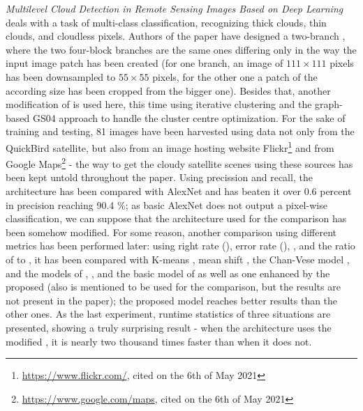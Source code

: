 \textit{Multilevel Cloud Detection in Remote Sensing Images Based on Deep Learning} deals with a task of multi-class classification, recognizing thick clouds, thin clouds, and cloudless pixels. Authors of the paper have designed a two-branch , where the two four-block branches are the same ones differing only in the way the input image patch has been created (for one branch, an image of $111 \times 111$ pixels has been downsampled to $55 \times 55$ pixels, for the other one a patch of the according size has been cropped from the bigger one). Besides that, another modification of  \cite{slic} is used here, this time using iterative clustering and the graph-based GS04 approach \cite{gs04} to handle the cluster centre optimization. For the sake of training and testing, 81  images have been harvested using data not only from the QuickBird satellite, but also from an image hosting website Flickr\footnote{\url{https://www.flickr.com/}, cited on the 6th of May 2021} and from Google Maps\footnote{\url{https://www.google.com/maps}, cited on the 6th of May 2021} - the way to get the cloudy satellite scenes using these sources has been kept untold throughout the paper. Using precission and recall, the architecture has been compared with AlexNet\cite{cnn-classification} and has beaten it over 0.6 percent in precision reaching 90.4 \%; as basic AlexNet does not output a pixel-wise classification, we can suppose that the architecture used for the comparison has been somehow modified. For some reason, another comparison using different metrics has been performed later: using right rate (), error rate (), , and the ratio of  to , it has been compared with K-means \cite{k-means}, mean shift \cite{mean-shift}, the Chan-Vese model \cite{chan-vese}, and the models of \cite{cloud-detection-progressive-refinement}, \cite{cloud-detection-scene-learning}, and the basic model of \cite{saliency-detection-dl} as well as one enhanced by the proposed  (also \cite{multiphase-mumford-shah} is mentioned to be used for the comparison, but the results are not present in the paper); the proposed model reaches better results than the other ones. As the last experiment, runtime statistics of three situations are presented, showing a truly surprising result - when the architecture uses the modified , it is nearly two thousand times faster than when it does not.

